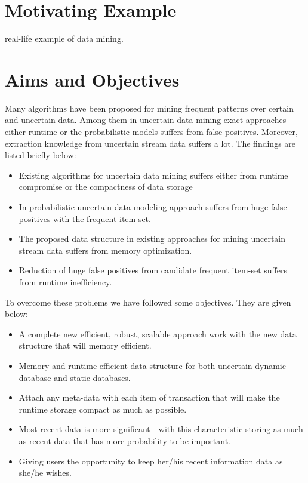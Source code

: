 \section{Motivating Example}
real-life example of data mining.


\section{Aims and Objectives}
Many algorithms have been proposed for mining frequent patterns over certain and uncertain data. Among them in uncertain data mining exact approaches either runtime or the probabilistic models suffers from false positives. Moreover, extraction knowledge from uncertain stream data suffers a lot. The findings are listed briefly below:
\begin{itemize}
    \item Existing algorithms for uncertain data mining suffers either from runtime compromise or the compactness of data storage
    \item In probabilistic uncertain data modeling approach suffers from huge false positives with the frequent item-set.
    \item The proposed data structure in existing approaches for mining uncertain stream data suffers from memory optimization.
    \item Reduction of huge false positives from candidate frequent item-set suffers from runtime inefficiency.
\end{itemize}
To overcome these problems we have followed some objectives. They are given below:
\begin{itemize}
    \item A complete new efficient, robust, scalable approach work with the new data structure that will memory efficient.
    \item Memory and runtime efficient data-structure for both uncertain dynamic database and static databases.
    \item Attach any meta-data with each item of transaction that will make the runtime storage compact as much as possible.
    \item Most recent data is more significant - with this characteristic storing as much as recent data that has more probability to be important.
    \item Giving users the opportunity to keep her/his recent information data as she/he wishes.

\end{itemize}


